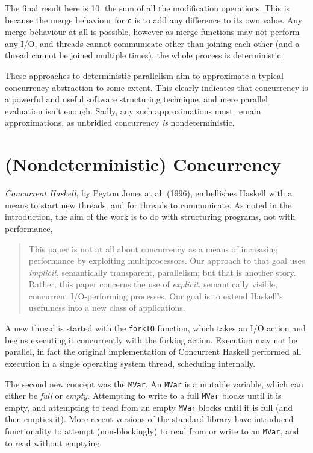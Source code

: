 The final result here is 10, the sum of all the modification
operations. This is because the merge behaviour for \verb|c| is to add
any difference to its own value. Any merge behaviour at all is
possible, however as merge functions may not perform any I/O, and
threads cannot communicate other than joining each other (and a thread
cannot be joined multiple times), the whole process is deterministic.

These approaches to deterministic parallelism aim to approximate a
typical concurrency abstraction to some extent. This clearly indicates
that concurrency is a powerful and useful software structuring
technique, and mere parallel evaluation isn't enough. Sadly, any such
approximations must remain approximations, as unbridled concurrency
\textit{is} nondeterministic.

\section{(Nondeterministic) Concurrency}
\label{sec:litrev-conc}

\textit{Concurrent Haskell}, by Peyton Jones at
al. (1996)\nocite{concurrent}, embellishes Haskell with a means to
start new threads, and for threads to communicate. As noted in the
introduction, the aim of the work is to do with structuring programs,
not with performance,

\begin{quote}
  This paper is not at all about concurrency as a means of increasing
  performance by exploiting multiprocessors. Our approach to that goal
  uses \textit{implicit}, semantically transparent, parallelism; but
  that is another story. Rather, this paper concerns the use of
  \textit{explicit}, semantically visible, concurrent I/O-performing
  processes. Our goal is to extend Haskell's usefulness into a new
  class of applications.\cite{concurrent}
\end{quote}

A new thread is started with the \verb|forkIO| function, which takes
an I/O action and begins executing it concurrently with the forking
action. Execution may not be parallel, in fact the original
implementation of Concurrent Haskell performed all execution in a
single operating system thread, scheduling internally.

The second new concept was the \verb|MVar|. An \verb|MVar| is a
mutable variable, which can either be \textit{full} or
\textit{empty}. Attempting to write to a full \verb|MVar| blocks until
it is empty, and attempting to read from an empty \verb|MVar| blocks
until it is full (and then empties it). More recent versions of the
standard library have introduced functionality to attempt
(non-blockingly) to read from or write to an \verb|MVar|, and to read
without emptying.

